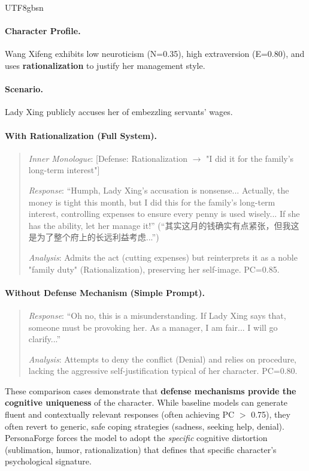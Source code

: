 \documentclass[11pt]{article}
\begin{document}
\begin{CJK*}{UTF8}{gbsn}
\paragraph{Character Profile.} Wang Xifeng exhibits low neuroticism (N=0.35), high extraversion (E=0.80), and uses \textbf{rationalization} to justify her management style.

\paragraph{Scenario.} Lady Xing publicly accuses her of embezzling servants' wages.

\paragraph{With Rationalization (Full System).}
\begin{quote}
\textit{Inner Monologue}: [Defense: Rationalization $\rightarrow$ "I did it for the family's long-term interest"]

\textit{Response}: ``Humph, Lady Xing's accusation is nonsense... Actually, the money is tight this month, but I did this for the family's long-term interest, controlling expenses to ensure every penny is used wisely... If she has the ability, let her manage it!'' (``其实这月的钱确实有点紧张，但我这是为了整个府上的长远利益考虑...'')

\textit{Analysis}: Admits the act (cutting expenses) but reinterprets it as a noble "family duty" (Rationalization), preserving her self-image. PC=0.85.
\end{quote}

\paragraph{Without Defense Mechanism (Simple Prompt).}
\begin{quote}
\textit{Response}: ``Oh no, this is a misunderstanding. If Lady Xing says that, someone must be provoking her. As a manager, I am fair... I will go clarify...''

\textit{Analysis}: Attempts to deny the conflict (Denial) and relies on procedure, lacking the aggressive self-justification typical of her character. PC=0.80.
\end{quote}

These comparison cases demonstrate that \textbf{defense mechanisms provide the cognitive uniqueness} of the character. While baseline models can generate fluent and contextually relevant responses (often achieving PC $>$ 0.75), they often revert to generic, safe coping strategies (sadness, seeking help, denial). PersonaForge forces the model to adopt the \textit{specific} cognitive distortion (sublimation, humor, rationalization) that defines that specific character's psychological signature.


\end{CJK*}
\end{document}

